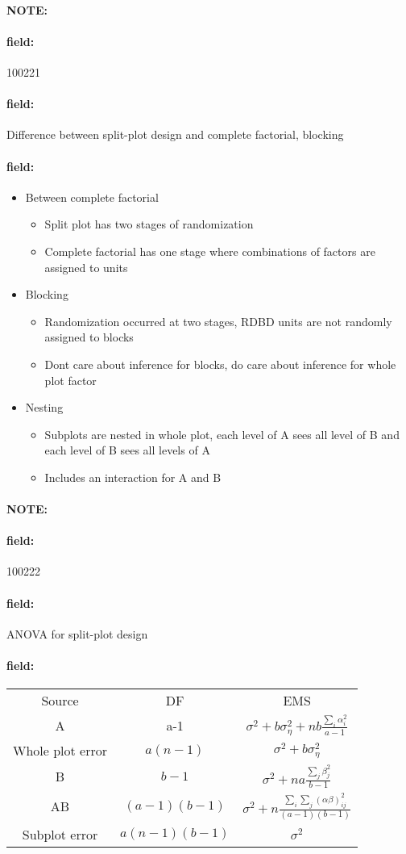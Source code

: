 \documentclass[12pt]{article}
\newenvironment{note}{\paragraph{NOTE:}}{}
\newenvironment{field}{\paragraph{field:}}{}
\begin{document}
\begin{note}
    \begin{field}
        \tiny 100221
    \end{field}
    \begin{field}
        Difference between split-plot design and complete factorial, blocking
    \end{field}
    \begin{field}
        \begin{itemize}
          \item Between complete factorial
          \begin{itemize}
            \item Split plot has two stages of randomization
            \item Complete factorial has one stage where combinations of factors are assigned to units
          \end{itemize}
          \item Blocking
          \begin{itemize}
            \item Randomization occurred at two stages, RDBD units are not randomly assigned to blocks
            \item Dont care about inference for blocks, do care about inference for whole plot factor
          \end{itemize}
          \item Nesting
          \begin{itemize}
            \item Subplots are nested in whole plot, each level of A sees all level of B and each level of B sees all levels of A
            \item Includes an interaction for A and B
          \end{itemize}
        \end{itemize}
    \end{field}
\end{note}


\begin{note}
    \begin{field}
        \tiny 100222
    \end{field}
    \begin{field}
        ANOVA for split-plot design
    \end{field}
    \begin{field}
        \begin{tabular}{c c c }
          Source & DF & EMS \\
          A & a-1 & $\sigma^2 + b \sigma_\eta^2 + nb \frac{\sum_i\alpha_i^2}{a-1}$\\
          Whole plot error & $a(n-1)$ & $\sigma^2 + b \sigma_\eta^2$\\
          B & $b-1$& $\sigma^2 + na \frac{\sum_j \beta_j^2}{b-1}$\\
          AB & $(a-1)(b-1)$ & $\sigma^2 + n \frac{\sum_i\sum_j (\alpha\beta)_{ij}^2}{(a-1)(b-1)}$\\
          Subplot error & $a(n-1)(b-1)$ & $\sigma^2$
        \end{tabular}
    \end{field}
\end{note}
\end{document}
